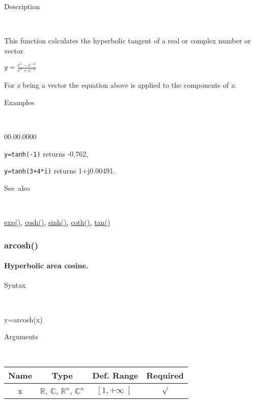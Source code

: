 \begin{description}
\item [Description]~
\end{description}
This function calculates the hyperbolic tangent of a real or complex
number or vector.

\medskip{}
$y={\displaystyle \frac{e^{x}-e^{-x}}{e^{x}+e^{-x}}}$ 
\medskip{}

For \textit{x} being a vector the equation above is applied
to the components of \textit{x}.

\begin{description}
\item [Examples]~
\end{description}
\begin{lyxlist}{00.00.0000}
\item [\texttt{y=tanh(-1)}]returns -0.762,
\item [\texttt{y=tanh(3+4{*}i)}]returns 1+j0.00491.
\end{lyxlist}
\begin{description}
\item [See~also]~
\end{description}
\textcolor{blue}{\hyperlink{exp}{exp()}}\textcolor{black}{,} \textcolor{blue}{\hyperlink{cosh}{cosh()}}\textcolor{black}{,}
\textcolor{blue}{\hyperlink{sinh}{sinh()}}\textcolor{black}{,} \textcolor{blue}{\hyperlink{coth}{coth()}}\textcolor{black}{,}
\textcolor{blue}{\hyperlink{tan}{tan()}}


\newpage
{}


\subsubsection*{\hypertarget{arcosh}{}{\Large arcosh()}}


\paragraph{\label{par:Hyperbolic-area-cosine}Hyperbolic area cosine.}

\begin{description}
\item [Syntax]~
\end{description}
y=arcosh(x)

\begin{description}
\item [Arguments]~
\end{description}
\begin{tabular}{|c|c|c|c|}
\hline 
Name&
Type&
Def. Range&
Required\tabularnewline
\hline
\hline 
x&
$\mathbb{R}$, $\mathbb{C}$, $\mathbb{R}^{n}$, $\mathbb{C}^{n}$&
$\left[1,+\infty\right[$&
$\surd$\tabularnewline
\hline
\end{tabular}

